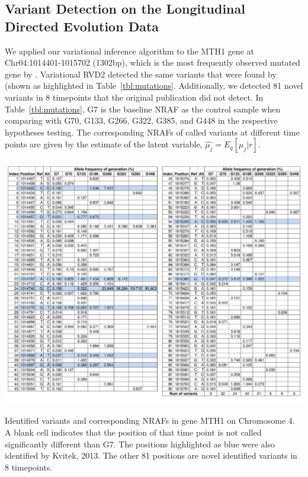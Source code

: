 \documentclass[11pt,reqno]{amsart}
\begin{document}
\subsection{Variant Detection on the Longitudinal Directed Evolution Data}
We applied our variational inference algorithm to the MTH1 gene at Chr04:1014401-1015702 (1302bp), which is the most frequently observed mutated gene by \citet{kvitek2013whole}.
Variational RVD2 detected the same variants that were found by \citet{kvitek2013whole} (shown as highlighted in Table~\ref{tbl:mutations}.
Additionally, we detected 81 novel variants in 8 timepoints that the original publication did not detect.
In Table~\ref{tbl:mutations}, G7 is the baseline NRAF as the control sample when comparing with G70, G133, G266, G322, G385, and G448 in the respective hypotheses testing.
The corresponding NRAFs of called variants at different time points are given by the estimate of the latent variable, $\hat{\mu_j} = E_q[\mu_j|r]$.
\begin{table}[htbp]
\centering
\includegraphics[width=1.0\textwidth]{tables/mutations_MTH1.png}
\caption{Identified variants and corresponding NRAFs in gene MTH1 on Chromosome 4.
A blank cell indicates that the position of that time point is not called significantly different than G7.
The positions highlighted as blue were also identified by Kvitek, 2013.
The other 81 positions are novel identified variants in 8 timepoints.}
\label{tbl:mutations}
\end{table}
\end{document}
